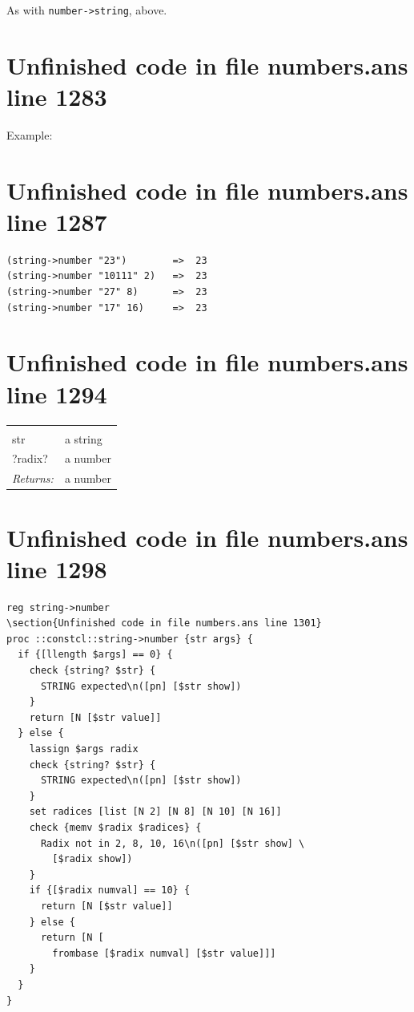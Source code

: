 \documentclass[twoside,9pt]{report}
\begin{document}
As with \texttt{number->string}, above.

\section{Unfinished code in file numbers.ans line 1283}


Example:

\section{Unfinished code in file numbers.ans line 1287}
\begin{verbatim}
(string->number "23")        =>  23
(string->number "10111" 2)   =>  23
(string->number "27" 8)      =>  23
(string->number "17" 16)     =>  23
\end{verbatim}
\section{Unfinished code in file numbers.ans line 1294}
\noindent\begin{tabular}{ |p{1.9cm} p{8cm}| }
\hline
\rowcolor[HTML]{CCCCCC} \multicolumn{2}{|l|}{\bf string->number (public)} \\
str & a string \\
?radix? & a number \\
\textit{Returns:} & a number \\
\hline
\end{tabular}
\section{Unfinished code in file numbers.ans line 1298}
\begin{lstlisting}
reg string->number
\section{Unfinished code in file numbers.ans line 1301}
proc ::constcl::string->number {str args} {
  if {[llength $args] == 0} {
    check {string? $str} {
      STRING expected\n([pn] [$str show])
    }
    return [N [$str value]]
  } else {
    lassign $args radix
    check {string? $str} {
      STRING expected\n([pn] [$str show])
    }
    set radices [list [N 2] [N 8] [N 10] [N 16]]
    check {memv $radix $radices} {
      Radix not in 2, 8, 10, 16\n([pn] [$str show] \
        [$radix show])
    }
    if {[$radix numval] == 10} {
      return [N [$str value]]
    } else {
      return [N [
        frombase [$radix numval] [$str value]]]
    }
  }
}
\end{lstlisting}
\end{document}
